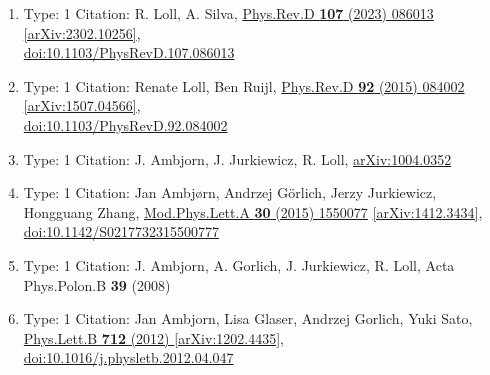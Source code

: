 \documentclass[a4paper,10pt]{article}
\begin{document}
\begin{enumerate}
\begin{enumerate}
  \item Type: 1 Citation: R. Loll, A. Silva, \href{https://www.doi.org/10.1103/PhysRevD.107.086013}{Phys.Rev.D {\bf 107} (2023) 086013}  \href{https://arxiv.org/abs/2302.10256}{[arXiv:2302.10256]},\\\href{https://www.doi.org/10.1103/PhysRevD.107.086013}{doi:10.1103/PhysRevD.107.086013}
  \item Type: 1 Citation: Renate Loll, Ben Ruijl, \href{https://www.doi.org/10.1103/PhysRevD.92.084002}{Phys.Rev.D {\bf 92} (2015) 084002}  \href{https://arxiv.org/abs/1507.04566}{[arXiv:1507.04566]},\\\href{https://www.doi.org/10.1103/PhysRevD.92.084002}{doi:10.1103/PhysRevD.92.084002}
  \item Type: 1 Citation: J. Ambjorn, J. Jurkiewicz, R. Loll, \href{https://arxiv.org/abs/1004.0352}{arXiv:1004.0352}
  \item Type: 1 Citation: Jan Ambjørn, Andrzej Görlich, Jerzy Jurkiewicz, Hongguang Zhang, \href{https://www.doi.org/10.1142/S0217732315500777}{Mod.Phys.Lett.A {\bf 30} (2015) 1550077}  \href{https://arxiv.org/abs/1412.3434}{[arXiv:1412.3434]},\\\href{https://www.doi.org/10.1142/S0217732315500777}{doi:10.1142/S0217732315500777}
  \item Type: 1 Citation: J. Ambjorn, A. Gorlich, J. Jurkiewicz, R. Loll, Acta Phys.Polon.B {\bf 39} (2008) 
  \item Type: 1 Citation: Jan Ambjorn, Lisa Glaser, Andrzej Gorlich, Yuki Sato, \href{https://www.doi.org/10.1016/j.physletb.2012.04.047}{Phys.Lett.B {\bf 712} (2012) }  \href{https://arxiv.org/abs/1202.4435}{[arXiv:1202.4435]},\\\href{https://www.doi.org/10.1016/j.physletb.2012.04.047}{doi:10.1016/j.physletb.2012.04.047}

\end{enumerate}
\end{enumerate}
\end{document}
